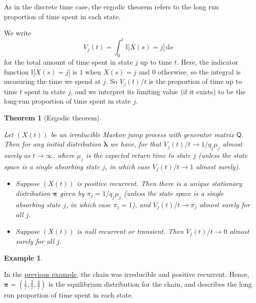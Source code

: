 \documentclass[
  a4paper,
]{article}
\providecommand{\tightlist}{%
  \setlength{\itemsep}{0pt}\setlength{\parskip}{0pt}}
\newtheorem{theorem}{Theorem}[section]
\theoremstyle{definition}
\theoremstyle{definition}
\newtheorem{example}{Example}[section]
\theoremstyle{definition}
\theoremstyle{remark}
\begin{document}
As in the discrete time case, the ergodic theorem refers to the long run proportion of time spent in each state.

We write
\[ V_j(t) = \int_0^t \mathbb{I}\big[X(s) = j\big]\, \mathrm ds \]
for the total amount of time spent in state \(j\) up to time \(t\).
Here, the indicator function \(\mathbb{I}\big[X(s) = j\big]\) is \(1\) when \(X(s) = j\) and \(0\) otherwise, so the integral is measuring the time we spend at \(j\). So \(V_j(t)/t\) is the proportion of time up to time \(t\) spent in state \(j\), and we interpret its limiting value (if it exists) to be the long-run proportion of time spent in state \(j\).

\begin{theorem}[Ergodic theorem]
\protect\hypertarget{thm:ergodic2}{}\label{thm:ergodic2}

Let \((X(t))\) be an irreducible Markov jump process with generator matrix \(\mathsf Q\). Then for any initial distribution \(\boldsymbol\lambda\) we have, for that \(V_j(t)/t \to 1/q_j\mu_j\) almost surely as \(t \to \infty\), where \(\mu_j\) is the expected return time to state \(j\) (unless the state space is a single absorbing state \(j\), in which case \(V_j(t)/t \to 1\) almost surely).

\begin{itemize}
\tightlist
\item
  Suppose \((X(t))\) is positive recurrent. Then there is a unique stationary distribution \(\boldsymbol\pi\) given by \(\pi_j = 1/q_j\mu_j\) (unless the state space is a single absorbing state \(j\), in which case \(\pi_j = 1\)), and \(V_j(t)/t \to \pi_j\) almost surely for all \(j\).
\item
  Suppose \((X(t))\) is null recurrent or transient. Then \(V_j(t)/t \to 0\) almost surely for all \(j\).
\end{itemize}

\end{theorem}

\begin{example}
\protect\hypertarget{exm:ergodic-ex-cont}{}\label{exm:ergodic-ex-cont}

In the \protect\hyperlink{stat-cont-ex}{previous example}, the chain was irreducible and positive recurrent. Hence, \(\boldsymbol\pi = (\frac17, \frac27, \frac47)\) is the equilibrium distribution for the chain, and describes the long run proportion of time spent in each state.

\end{example}
\end{document}

